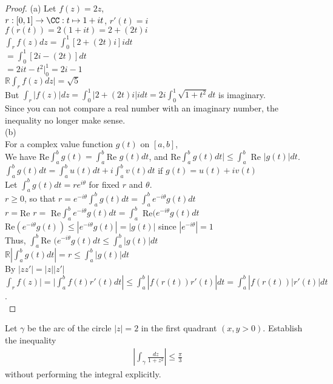 \documentclass[12pt]{article}
\newcommand{\R}{\mathbb{R}}
\newenvironment{exercise}[2][Exercise]{\begin{trivlist}
\item[\hskip \labelsep {\bfseries #1}\hskip \labelsep {\bfseries #2.}]}{\end{trivlist}}
\begin{document}
\begin{proof}

(a) Let $f(z)=2z$,\\
$r:[0,1]\to \CC: t\mapsto 1+it$, $r'(t)=i$\\
$f(r(t))=2(1+it)=2+(2t)i$\\
$\int_r f(z) dz=\int^1_0 [2+(2t)i]i dt$\\
$=\int_0^1 [2i-(2t)]dt$\\
$=2it-t^2|_0^1=2i-1$\\
$\R\int_r f(z) dz|=\sqrt{5}$\\
But $\int_r|f(z)|dz =\int_0^1 |2+(2t)i| idt=2i\int_0^1\sqrt{1+t^2}dt$ is imaginary.\\
Since you can not compare a real number with an imaginary number, the inequality no longer make sense.\\

(b)\\
For a complex value function $g(t)$ on $[a,b]$,\\
We have Re$\int_a^b g(t)=\int_a^b $Re $g(t) dt $, and Re$\int_a^b g(t) dt|\leq \int _a^b$ Re $|g(t)|dt$.\\
$\int_a^b g(t) dt =\int_a^b u(t) dt+i \int_a^b v(t) dt $ if $g(t) =u(t)+iv(t)$\\
Let $\int_a^b g(t) dt =r e^{i\theta}$ for fixed $r$ and $\theta$.\\
$r\geq 0$, so that $r=e^{-i\theta}\int_a^b g(t) dt=\int_a^b e^{-i\theta}g(t) dt$\\
$r=$Re $r=$ Re$\int_a^b e^{-i\theta} g(t) dt =\int_a^b$ Re$(e^{-i\theta}g(t) dt$\\
Re$(e^{-i\theta} g(t))\leq |e^{-i\theta}g(t)|=|g(t)|$ since $|e^{-i\theta}|=1$\\
Thus, $\int_a^b$Re $(e^{-i\theta} g(t) dt\leq \int_a^b |g(t)| dt$\\
$\R |\int_a^b g(t) dt|=r \leq \int_a^b |g(t)| dt$\\
By $|zz'|=|z||z'|$\\
$\int_r f(z)| =|\int_a^b f(t) r'(t) dt|\leq \int_a^b |f(r(t)) r'(t)| dt=\int_a^b |f(r(t))|r'(t)|dt$.\\

\end{proof}

\begin{exercise}{3} Let $\gamma$ be the arc of the circle $|z| = 2$ in the first quadrant $(x,y>0)$. Establish the inequality
\begin{align*}
\left| \int_{\gamma} \frac{dz}{1 + z^2} \right| \leq \frac{\pi}{3}
\end{align*}
without performing the integral explicitly. 
\end{exercise}
 
\end{document}
